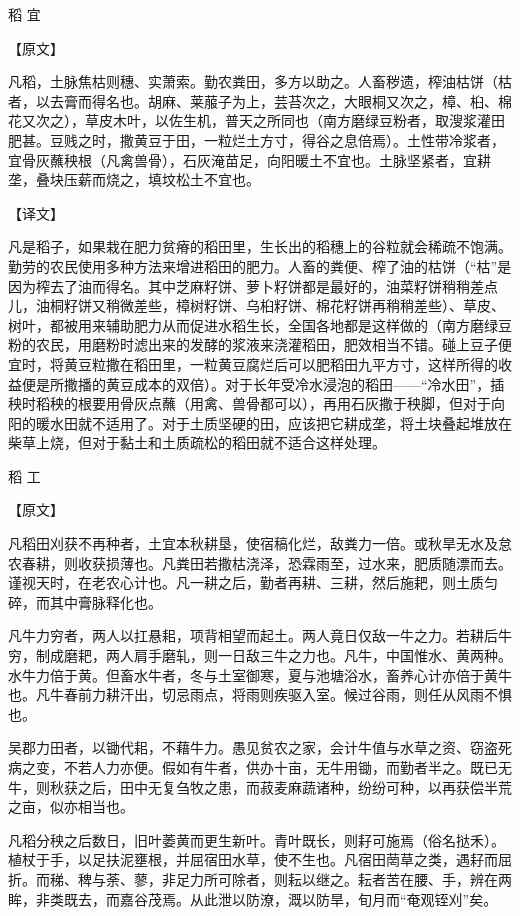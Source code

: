 \documentclass[12pt,UTF8]{ctexbook}
\begin{document}
稻 宜

【原文】

凡稻，土脉焦枯则穗、实萧索。勤农粪田，多方以助之。人畜秽遗，榨油枯饼（枯者，以去膏而得名也。胡麻、莱菔子为上，芸苔次之，大眼桐又次之，樟、桕、棉花又次之），草皮木叶，以佐生机，普天之所同也（南方磨绿豆粉者，取溲浆灌田肥甚。豆贱之时，撒黄豆于田，一粒烂土方寸，得谷之息倍焉）。土性带冷浆者，宜骨灰蘸秧根（凡禽兽骨），石灰淹苗足，向阳暖土不宜也。土脉坚紧者，宜耕垄，叠块压薪而烧之，填坟松土不宜也。

【译文】

凡是稻子，如果栽在肥力贫瘠的稻田里，生长出的稻穗上的谷粒就会稀疏不饱满。勤劳的农民使用多种方法来增进稻田的肥力。人畜的粪便、榨了油的枯饼（“枯”是因为榨去了油而得名。其中芝麻籽饼、萝卜籽饼都是最好的，油菜籽饼稍稍差点儿，油桐籽饼又稍微差些，樟树籽饼、乌桕籽饼、棉花籽饼再稍稍差些）、草皮、树叶，都被用来辅助肥力从而促进水稻生长，全国各地都是这样做的（南方磨绿豆粉的农民，用磨粉时滤出来的发酵的浆液来浇灌稻田，肥效相当不错。碰上豆子便宜时，将黄豆粒撒在稻田里，一粒黄豆腐烂后可以肥稻田九平方寸，这样所得的收益便是所撒播的黄豆成本的双倍）。对于长年受冷水浸泡的稻田——“冷水田”，插秧时稻秧的根要用骨灰点蘸（用禽、兽骨都可以），再用石灰撒于秧脚，但对于向阳的暖水田就不适用了。对于土质坚硬的田，应该把它耕成垄，将土块叠起堆放在柴草上烧，但对于黏土和土质疏松的稻田就不适合这样处理。

稻 工

【原文】

凡稻田刈获不再种者，土宜本秋耕垦，使宿稿化烂，敌粪力一倍。或秋旱无水及怠农春耕，则收获损薄也。凡粪田若撒枯浇泽，恐霖雨至，过水来，肥质随漂而去。谨视天时，在老农心计也。凡一耕之后，勤者再耕、三耕，然后施耙，则土质匀碎，而其中膏脉释化也。

凡牛力穷者，两人以扛悬耜，项背相望而起土。两人竟日仅敌一牛之力。若耕后牛穷，制成磨耙，两人肩手磨轧，则一日敌三牛之力也。凡牛，中国惟水、黄两种。水牛力倍于黄。但畜水牛者，冬与土室御寒，夏与池塘浴水，畜养心计亦倍于黄牛也。凡牛春前力耕汗出，切忌雨点，将雨则疾驱入室。候过谷雨，则任从风雨不惧也。

吴郡力田者，以锄代耜，不藉牛力。愚见贫农之家，会计牛值与水草之资、窃盗死病之变，不若人力亦便。假如有牛者，供办十亩，无牛用锄，而勤者半之。既已无牛，则秋获之后，田中无复刍牧之患，而菽麦麻蔬诸种，纷纷可种，以再获偿半荒之亩，似亦相当也。

凡稻分秧之后数日，旧叶萎黄而更生新叶。青叶既长，则耔可施焉（俗名挞禾）。植杖于手，以足扶泥壅根，并屈宿田水草，使不生也。凡宿田菵草之类，遇耔而屈折。而稊、稗与荼、蓼，非足力所可除者，则耘以继之。耘者苦在腰、手，辨在两眸，非类既去，而嘉谷茂焉。从此泄以防潦，溉以防旱，旬月而“奄观铚刈”矣。
\end{document}
